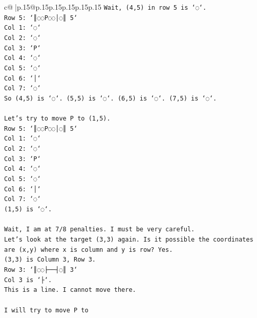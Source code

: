 \documentclass{article}
\begin{document}
{\begin{supertabular}{c@{$\;$}|p{.15\linewidth}@{}p{.15\linewidth}p{.15\linewidth}p{.15\linewidth}p{.15\linewidth}p{.15\linewidth}}
{{{\texttt{Wait, (4,5) in row 5 is `◌`.} \\
\texttt{Row 5: `║◌◌P◌◌│◌║ 5`} \\
\texttt{Col 1: `◌`} \\
\texttt{Col 2: `◌`} \\
\texttt{Col 3: `P`} \\
\texttt{Col 4: `◌`} \\
\texttt{Col 5: `◌`} \\
\texttt{Col 6: `│`} \\
\texttt{Col 7: `◌`} \\
\texttt{So (4,5) is `◌`. (5,5) is `◌`. (6,5) is `◌`. (7,5) is `◌`.} \\
\\ 
\texttt{Let's try to move P to (1,5).} \\
\texttt{Row 5: `║◌◌P◌◌│◌║ 5`} \\
\texttt{Col 1: `◌`} \\
\texttt{Col 2: `◌`} \\
\texttt{Col 3: `P`} \\
\texttt{Col 4: `◌`} \\
\texttt{Col 5: `◌`} \\
\texttt{Col 6: `│`} \\
\texttt{Col 7: `◌`} \\
\texttt{(1,5) is `◌`.} \\
\\ 
\texttt{Wait, I am at 7/8 penalties. I must be very careful.} \\
\texttt{Let's look at the target (3,3) again. Is it possible the coordinates are (x,y) where x is column and y is row? Yes.} \\
\texttt{(3,3) is Column 3, Row 3.} \\
\texttt{Row 3: `║◌◌├──┤◌║ 3`} \\
\texttt{Col 3 is `├`.} \\
\texttt{This is a line. I cannot move there.} \\
\\ 
\texttt{I will try to move P to} \\
            }
        }
    }
     \\ \\


\end{supertabular}}
\end{document}
